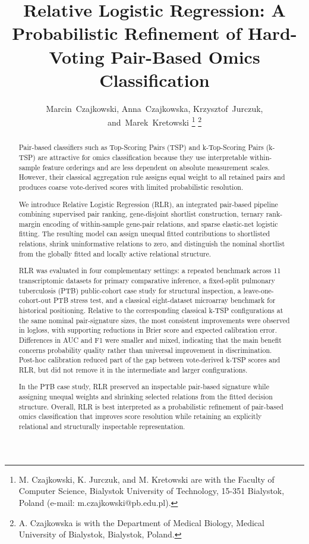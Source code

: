 \documentclass[journal]{IEEEtran}
\begin{document}
\title{Relative Logistic Regression: A Probabilistic Refinement of Hard-Voting Pair-Based Omics Classification}

\author{Marcin~Czajkowski,
        Anna~Czajkowska,
        Krzysztof~Jurczuk,
        and~Marek~Kretowski%
\thanks{M. Czajkowski, K. Jurczuk, and M. Kretowski are with the Faculty of Computer Science, Bialystok University of Technology, 15-351 Bialystok, Poland (e-mail: m.czajkowski@pb.edu.pl).}%
\thanks{A. Czajkowska is with the Department of Medical Biology, Medical University of Bialystok, Bialystok, Poland.}}

\maketitle

\begin{abstract}
Pair-based classifiers such as Top-Scoring Pairs (TSP) and k-Top-Scoring Pairs (k-TSP) are attractive for omics classification because they use interpretable within-sample feature orderings and are less dependent on absolute measurement scales. However, their classical aggregation rule assigns equal weight to all retained pairs and produces coarse vote-derived scores with limited probabilistic resolution.

We introduce Relative Logistic Regression (RLR), an integrated pair-based pipeline combining supervised pair ranking, gene-disjoint shortlist construction, ternary rank-margin encoding of within-sample gene-pair relations, and sparse elastic-net logistic fitting. The resulting model can assign unequal fitted contributions to shortlisted relations, shrink uninformative relations to zero, and distinguish the nominal shortlist from the globally fitted and locally active relational structure.

RLR was evaluated in four complementary settings: a repeated benchmark across 11 transcriptomic datasets for primary comparative inference, a fixed-split pulmonary tuberculosis (PTB) public-cohort case study for structural inspection, a leave-one-cohort-out PTB stress test, and a classical eight-dataset microarray benchmark for historical positioning. Relative to the corresponding classical k-TSP configurations at the same nominal pair-signature sizes, the most consistent improvements were observed in logloss, with supporting reductions in Brier score and expected calibration error. Differences in AUC and F1 were smaller and mixed, indicating that the main benefit concerns probability quality rather than universal improvement in discrimination. Post-hoc calibration reduced part of the gap between vote-derived k-TSP scores and RLR, but did not remove it in the intermediate and larger configurations.

In the PTB case study, RLR preserved an inspectable pair-based signature while assigning unequal weights and shrinking selected relations from the fitted decision structure. Overall, RLR is best interpreted as a probabilistic refinement of pair-based omics classification that improves score resolution while retaining an explicitly relational and structurally inspectable representation.
\end{abstract}
\end{document}
